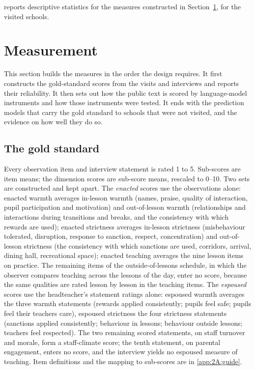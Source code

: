  reports descriptive statistics for the measures
constructed in Section~\ref{sec:p1_measurement}, for the visited schools.





\section{Measurement}
\label{sec:p1_measurement}

This section builds the measures in the order the design requires. It first
constructs the gold-standard scores from the visits and interviews and reports
their reliability. It then sets out how the public text is scored by
language-model instruments and how those instruments were tested. It ends
with the prediction models that carry the gold standard to schools that were
not visited, and the evidence on how well they do so.

\subsection{The gold standard}

Every observation item and interview statement is rated 1 to 5. Sub-scores
are item means; the dimension scores are sub-score means, rescaled to 0--10.
Two sets are constructed and kept apart. The \emph{enacted} scores use the
observations alone: enacted warmth averages in-lesson warmth (names, praise,
quality of interaction, pupil participation and motivation) and out-of-lesson
warmth (relationships and interactions during transitions and breaks, and the
consistency with which rewards are used); enacted strictness averages
in-lesson strictness (misbehaviour tolerated, disruption, response to
sanction, respect, concentration) and out-of-lesson strictness (the
consistency with which sanctions are used, corridors, arrival, dining hall,
recreational space); enacted teaching averages the nine lesson items on
practice. The remaining items of the outside-of-lessons schedule, in which the
observer compares teaching across the lessons of the day, enter no score,
because the same qualities are rated lesson by lesson in the teaching items.
The \emph{espoused} scores use the headteacher's statement ratings alone:
espoused warmth averages the three warmth statements (rewards applied
consistently; pupils feel safe; pupils feel their teachers care), espoused
strictness the four strictness statements (sanctions applied consistently;
behaviour in lessons; behaviour outside lessons; teachers feel respected). The
two remaining scored statements, on staff turnover and morale, form a
staff-climate score; the tenth statement, on parental engagement, enters no
score, and the interview yields no espoused measure of teaching. Item
definitions and the mapping to sub-scores are in \cref{app:2A:guide}.

